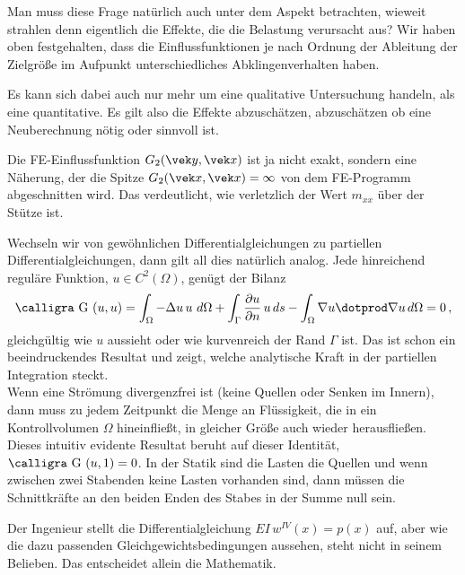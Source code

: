 {{{{Man muss diese Frage nat\"{u}rlich auch unter dem Aspekt betrachten, wieweit strahlen denn eigentlich die Effekte, die die Belastung verursacht aus? Wir haben oben festgehalten, dass die Einflussfunktionen je nach Ordnung der Ableitung der Zielgr\"{o}{\ss}e im Aufpunkt unterschiedliches Abklingenverhalten haben.

Es kann sich dabei auch nur mehr um eine qualitative Untersuchung handeln, als eine quantitative. Es gilt also die Effekte abzusch\"{a}tzen, abzusch\"{a}tzen ob eine Neuberechnung n\"{o}tig oder sinnvoll ist.


Die FE-Einflussfunktion $G_2(\vek y,\vek x)$ ist ja nicht exakt, sondern eine N\"{a}herung, der die Spitze $G_2(\vek x,\vek x) = \infty$ von dem FE-Programm abgeschnitten wird. Das verdeutlicht, wie verletzlich der Wert $m_{xx}$ \"{u}ber der St\"{u}tze ist.

Wechseln wir von gew\"{o}hnlichen Differentialgleichungen zu partiellen Differentialgleichungen, dann gilt all dies nat\"{u}rlich analog. Jede hinreichend regul\"{a}re Funktion, $u \in C^2(\Omega)$, gen\"{u}gt der Bilanz
\begin{align}\label{Eq90}
\text{\normalfont\calligra G\,\,}(u, u) = \int_{\Omega} - \Delta u\,u\,\,d\Omega + \int_{\Gamma} \frac{\partial u}{\partial n}\,u\,ds - \int_{\Omega} \nabla u \dotprod \nabla u\,d\Omega = 0\,,
\end{align}
gleichg\"{u}ltig wie $u$ aussieht oder wie kurvenreich der Rand $\Gamma$ ist. Das ist schon ein beeindruckendes Resultat und zeigt, welche analytische Kraft in der partiellen Integration steckt.\\

Wenn eine Str\"{o}mung divergenzfrei ist (keine Quellen oder Senken im Innern), dann muss zu jedem Zeitpunkt die Menge an Fl\"{u}ssigkeit, die in ein Kontrollvolumen $\Omega$ hineinflie{\ss}t, in gleicher Gr\"{o}{\ss}e auch wieder herausflie{\ss}en. Dieses intuitiv evidente Resultat beruht auf dieser Identit\"{a}t, $\text{\normalfont\calligra G\,\,}(u, 1) = 0$. In der Statik sind die Lasten die Quellen und wenn zwischen zwei Stabenden keine Lasten vorhanden sind, dann m\"{u}ssen die Schnittkr\"{a}fte an den beiden Enden des Stabes in der Summe null sein. \\

\hspace*{-12pt}\colorbox{hellgrau}{\parbox{0.98\textwidth}{Der Ingenieur stellt die Differentialgleichung $EI\,w^{IV}(x) = p(x)$ auf, aber wie die dazu passenden Gleichgewichtsbedingungen aussehen, steht nicht in seinem Belieben. Das entscheidet allein die Mathematik.}}\\

}}}}
